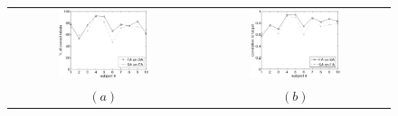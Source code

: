 \documentclass{article}
\begin{document}

\begin{figure}[!ht] \centering
  \begin{tabular}{cc}
    \includegraphics[width=0.50\textwidth]{2on1_class.eps} &
    \includegraphics[width=0.50\textwidth]{2on1_regr.eps} \\
    $(a)$ & $(b)$ \\
  \end{tabular}
\end{figure}
\end{document}
